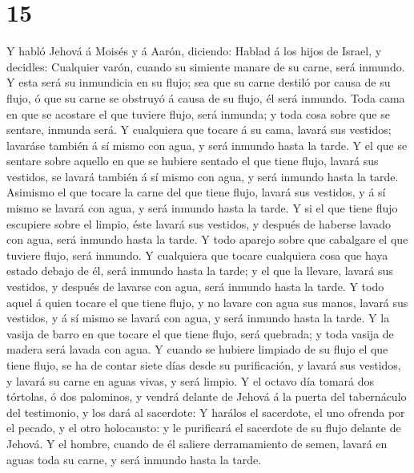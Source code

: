 \hypertarget{section-14}{%
\section{15}\label{section-14}}

 Y habló Jehová á Moisés y á Aarón, diciendo:
 Hablad á los hijos de Israel, y decidles: Cualquier
varón, cuando su simiente manare de su carne, será inmundo.
 Y esta será su inmundicia en su flujo; sea que su carne
destiló por causa de su flujo, ó que su carne se obstruyó á causa de su
flujo, él será inmundo.  Toda cama en que se acostare el
que tuviere flujo, será inmunda; y toda cosa sobre que se sentare,
inmunda será.  Y cualquiera que tocare á su cama, lavará
sus vestidos; lavaráse también á sí mismo con agua, y será inmundo hasta
la tarde.  Y el que se sentare sobre aquello en que se
hubiere sentado el que tiene flujo, lavará sus vestidos, se lavará
también á sí mismo con agua, y será inmundo hasta la tarde.
 Asimismo el que tocare la carne del que tiene flujo,
lavará sus vestidos, y á sí mismo se lavará con agua, y será inmundo
hasta la tarde.  Y si el que tiene flujo escupiere sobre
el limpio, éste lavará sus vestidos, y después de haberse lavado con
agua, será inmundo hasta la tarde.  Y todo aparejo sobre
que cabalgare el que tuviere flujo, será inmundo.  Y
cualquiera que tocare cualquiera cosa que haya estado debajo de él, será
inmundo hasta la tarde; y el que la llevare, lavará sus vestidos, y
después de lavarse con agua, será inmundo hasta la tarde.
 Y todo aquel á quien tocare el que tiene flujo, y no
lavare con agua sus manos, lavará sus vestidos, y á sí mismo se lavará
con agua, y será inmundo hasta la tarde.  Y la vasija de
barro en que tocare el que tiene flujo, será quebrada; y toda vasija de
madera será lavada con agua.  Y cuando se hubiere
limpiado de su flujo el que tiene flujo, se ha de contar siete días
desde su purificación, y lavará sus vestidos, y lavará su carne en aguas
vivas, y será limpio.  Y el octavo día tomará dos
tórtolas, ó dos palominos, y vendrá delante de Jehová á la puerta del
tabernáculo del testimonio, y los dará al sacerdote:  Y
harálos el sacerdote, el uno ofrenda por el pecado, y el otro
holocausto: y le purificará el sacerdote de su flujo delante de Jehová.
 Y el hombre, cuando de él saliere derramamiento de
semen, lavará en aguas toda su carne, y será inmundo hasta la tarde.
